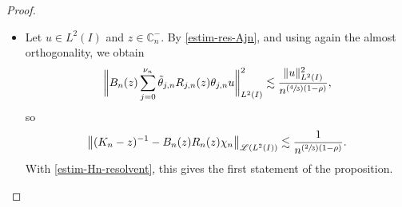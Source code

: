 \documentclass[10pt]{amsart}
\let\mathcal\mathscr
\newcommand{\Psfrac}[2]{(\sfrac{#1}{#2})}
\newcommand{\psfrac}[2]{\sfrac{(#1)}{#2}}
\theoremstyle{plain}
\theoremstyle{definition}
\newcommand {\limt}[2]{\xrightarrow[#1 \to #2]{}}
\newcommand{\abs}[1]{\vert #1\vert}
\newcommand{\nr}[1]{\Vert #1\Vert}
\newcommand{\bnr}[1]{\bigl\Vert #1\bigr\Vert}
\newcommand{\bbnr}[1]{\biggl\Vert #1\biggr\Vert}
\newcommand{\Ii}[2] {\left\{ #1,\dots,#2 \right\}}
\newcommand{\inv}{^{-1}}
\newcommand{\1}{\mathds 1}
\newcommand{\Dom}{\mathsf{Dom}}
\newcommand{\R}{\mathbb{R}}
\def\C{\mathbb{C}}
\newcommand{\N}{\mathbb{N}}
\let\d\delta
\let\th\theta
\let\h\chi
\newcommand{\Lc}{{\mathcal L}}
\begin{document}
\begin{proof}
\begin{itemize}
Let $\tilde \th \in C_0^\infty(\R,[0,1])$ be equal to 1 on $\big[-\sfrac 23,\sfrac 23\big]$ and supported in $]-1,1[$. Then for $n \in \N^*$, $j \in \Ii 1 {\nu_n}$ and $y \in \bar I$ we set
\[
\tilde \th_{j,n}(y) = \tilde \th \bigl(\psfrac {y-a_{j,n}}{\d_n} \bigr),
\]
and then
\begin{equation} \label{eq_def_Qn}
Q_n(z) = R_n(z) \h_n + \sum_{j=0}^{\nu_n} \tilde \theta_{j,n} R_{j,n}(z) \theta_{j,n}.
\end{equation}
For $u \in \Dom(K_n)$ and $z \in \C_n^-$ we have $\th_{j,n} u = \th_{j,n} \tilde \th_{j,n} u$ and
\[
\theta_{j,n} (K_n-z) (1- \tilde \theta_{j,n}) u = 0,
\]
so
\[
\nr{Q_n(z) (K_n-z) u - u }_{L^2(I)} \leq \nr{T_n(z) u}_{L^2(I)} + \bbnr{\sum_{j=0}^{\nu_n} \tilde \th_{j,n} T_{j,n}(z) \tilde \th_{j,n} u}_{L^2(I)}.
\]
Moreover $\tilde \th_{j,n} \tilde \th_{k,n} = 0$ whenever $\abs{j-k} \geq 2$, so by almost orthogonaly (twice) we can write
\begin{align*}
\bbnr{\sum_{j=0}^{\nu_n} \tilde \th_{j,n} T_{j,n}(z) \tilde \th_{j,n} u}^2_{L^2(I)}
& \lesssim \sum_{j=0}^{\nu_n} \nr{\tilde \th_{j,n} T_{j,n}(z) \tilde \th_{j,n} u}^2_{L^2(I)}\\
& \lesssim \sup_{0\leq j \leq \nu_n} \nr{T_{j,n}(z)}_{\Lc(L^2(I))}^2 \sum_{j=0}^{\nu_n} \nr{\tilde \th_{j,n} u}^2_{L^2(I)}\\
& \lesssim \sup_{0\leq j \leq \nu_n} \nr{T_{j,n}(z)}_{\Lc(L^2(I))}^2\, \nr{u}^2_{L^2(I)}.
\end{align*}
This proves
\begin{equation} \label{eq-Qn-Kn-z}
\sup_{z \in \C_n^-} \sup_{\substack{u \in \Dom(K_n)\\ \nr{u}_{L^2(I)} = 1}} \nr{Q_n(z) (K_n-z) u - u}_{L^2(I)} \limt n {+\infty} 0.
\end{equation}
Thus for $n$ large enough the operator $K_n$ has no eigenvalue and hence no spectrum in $\C_n^-$. Moreover for $z \in \C_n^-$ we have
\begin{equation} \label{eq-Qngoodapprox}
(K_n-z)\inv = B_n(z) Q_n(z),
\end{equation}
where
\[
B_n(z) = \bigl(1 + \bigl(Q_n(z) (K_n-z) - 1 \bigr) \bigr)\inv
\]
is bounded on $L^2(I)$ uniformly in $z \in \C_n^-$ and $n$ large enough.

\item
Let $u \in L^2(I)$ and $z \in \mathbb{C}_n^-$. By \eqref{estim-res-Ajn}, and using again the almost orthogonality, we obtain
\[
\bbnr{B_n(z) \sum_{j=0}^{\nu_n} \tilde \theta_{j,n} R_{j,n}(z) \theta_{j,n} u}^2_{L^2(I)} \lesssim \frac {\nr{u}^2_{L^2(I)}}{n ^{\Psfrac 43(1-\rho)}},
\]
so
\begin{equation} \label{eq-res-Kn-Rn}
\bnr{(K_n-z)\inv - B_n(z) R_n(z) \h_n }_{\Lc(L^2(I))} \lesssim \frac 1 {n^{\Psfrac 23(1-\rho)}}.
\end{equation}
With \eqref{estim-Hn-resolvent}, this gives the first statement of the proposition.


\end{itemize}
\end{proof}
\end{document}
